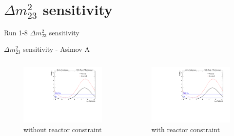 \documentclass{beamer}
\newcommand{\dmsqtwothree}{$\Delta m^2_{23}$\xspace}
\begin{document}
\section{\dmsqtwothree sensitivity}
\begin{frame}
	\centering
	\Large Run 1-8 \dmsqtwothree sensitivity\\
\end{frame}

\begin{frame}{\dmsqtwothree sensitivity - Asimov A}
	\centering
	\begin{columns}
		\begin{column}{0.5\paperwidth}
			\begin{figure}
				\includegraphics[trim={0cm 0cm 0cm 0cm}, clip, scale=0.33] {images/sensitivity/dmsq23_global_t2k}
				\caption*{without reactor constraint}
			\end{figure}
		\end{column}
		\begin{column}{0.5\paperwidth}
			\begin{figure}
				\includegraphics[trim={0cm 0cm 0cm 0cm}, clip, scale=0.33] {images/sensitivity/dmsq23_global_t2k}
				\caption*{with reactor constraint}
			\end{figure}
		\end{column}
	\end{columns}
\end{frame}
\end{document}
